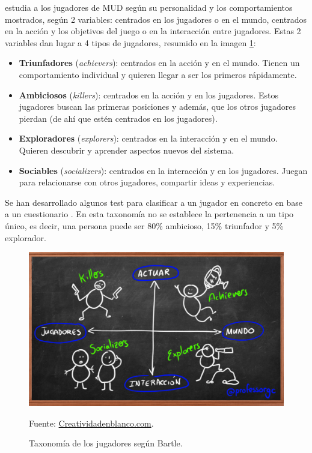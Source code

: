 \cite{TypeMUD} estudia a los jugadores de \gls{MUD} según su personalidad y los comportamientos mostrados, según 2 variables: centrados en los jugadores o en el mundo, centrados en la acción y los objetivos del juego o en la interacción entre jugadores.
%
Estas 2 variables dan lugar a 4 tipos de jugadores, resumido en la imagen \ref{fig::Bartle}:
\begin{itemize}
	\item  \textbf{Triunfadores} (\textit{achievers}): centrados en la acción y en el mundo.
	Tienen un comportamiento individual y quieren llegar a ser los primeros rápidamente.
	

	\item \textbf{Ambiciosos} (\textit{killers}): centrados en la acción y en los jugadores. 
	Estos jugadores buscan las primeras posiciones y además, que los otros jugadores pierdan (de ahí que estén centrados en los jugadores).
	

	\item \textbf{Exploradores} (\textit{explorers}): centrados en la interacción y en el mundo.
	Quieren descubrir y aprender aspectos nuevos del sistema.

	\item \textbf{Sociables} (\textit{socializers}): centrados en la interacción y en los jugadores.
	Juegan para relacionarse con otros jugadores, compartir ideas y experiencias.
\end{itemize}

Se han desarrollado algunos test para clasificar a un jugador en concreto en base a un cuestionario \cite{Bartletest}.
%
En esta taxonomía no se establece la pertenencia a un tipo único, es decir, una persona puede ser 80\% ambicioso, 15\% triunfador y 5\% explorador.


\begin{figure}[hbt]
\begin{center}
\includegraphics[scale=0.25]{img/Bartle.png}
\caption{Taxonomía de los jugadores según Bartle.}
\label{fig::Bartle}
\vspace{-0.25cm}
\small{Fuente: \url{Creatividadenblanco.com}.}
\end{center}
\end{figure}

